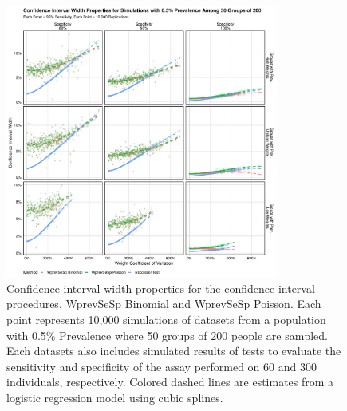 \documentclass[AMA,STIX1COL]{WileyNJD-v2}
\begin{document}
\begin{figure}
\centering
\includegraphics[width=0.8\textwidth]{figures/imperfect_confidence_interval_width_50_groups_0_005_prev}
\caption{Confidence interval width properties for the confidence interval procedures, WprevSeSp Binomial and WprevSeSp Poisson.
Each point represents 10,000 simulations of datasets from a population with 0.5\% Prevalence where 50 groups of 200 people are sampled.
Each datasets also includes simulated results of tests to evaluate the sensitivity and specificity of the assay performed on 60 and 300 individuals, respectively.
Colored dashed lines are estimates from a logistic regression model using cubic splines.}
\label{fig:imperfect_confidence_interval_width_50_groups_0_005_prev}
\end{figure}
\end{document}
